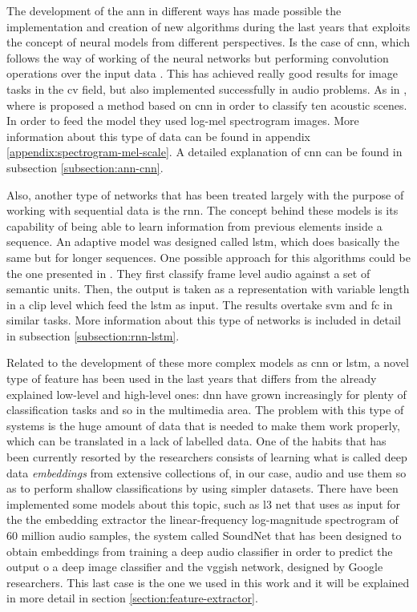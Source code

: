 	The development of the \acrshort{ann} in different ways has made possible the implementation and creation of new algorithms during the last years that exploits the concept of neural models from different perspectives. Is the case of \acrfull{cnn}, which follows the way of working of the neural networks but performing convolution operations over the input data \cite{Fu2011}. This has achieved really good results for image tasks in the \acrlong{cv} field, but also implemented successfully in audio problems. As in \cite{Ren2018}, where is proposed a method based on \acrshort{cnn} in order to classify ten acoustic scenes. In order to feed the model they used log-mel spectrogram images. More information about this type of data can be found in appendix \ref{appendix:spectrogram-mel-scale}. A detailed explanation of \acrshort{cnn} can be found in subsection \ref{subsection:ann-cnn}.
	
	Also, another type of networks that has been treated largely with the purpose of working with sequential data is the \acrfull{rnn}. The concept behind these models is its capability of being able to learn information from previous elements inside a sequence. An adaptive model was designed called \acrshort{lstm}, which does basically the same but for longer sequences. One possible approach for this algorithms could be the one presented in \cite{Wang2016}. They first classify frame level audio against a set of semantic units. Then, the output is taken as a representation with variable length in a clip level which feed the \acrshort{lstm} as input. The results overtake \acrshort{svm} and \acrshort{fc} in similar tasks. More information about this type of networks is included in detail in subsection \ref{subsection:rnn-lstm}.
	
	Related to the development of these more complex models as \acrshort{cnn} or \acrshort{lstm}, a novel type of feature has been used in the last years that differs from the already explained low-level and high-level ones: \acrfull{dnn} have grown increasingly for plenty of classification tasks and so in the multimedia area. The problem with this type of systems is the huge amount of data that is needed to make them work properly, which can be translated in a lack of labelled data. One of the habits that has been currently resorted by the researchers consists of learning what is called deep data \textit{embeddings} from extensive collections of, in our case, audio and use them so as to perform shallow classifications by using simpler datasets. There have been implemented some models about this topic, such as \acrfull{l3} \cite{Cramer2019} net that uses as input for the the embedding extractor the linear-frequency log-magnitude spectrogram of 60 million audio samples, the system called SoundNet \cite{Aytar2016} that has been designed to obtain embeddings from training a deep audio classifier in order to predict the output o a deep image classifier and the \acrshort{vgg}ish network, designed by Google researchers. This last case is the one we used in this work and it will be explained in more detail in section \ref{section:feature-extractor}.
	
